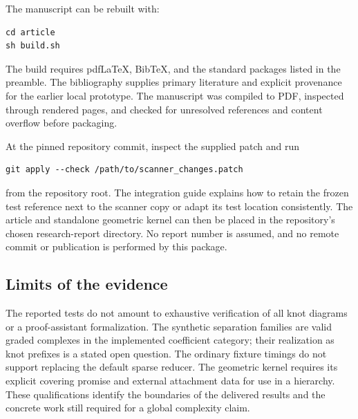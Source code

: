 The manuscript can be rebuilt with:
\begin{lstlisting}
cd article
sh build.sh
\end{lstlisting}
The build requires pdf\LaTeX{}, Bib\TeX{}, and the standard packages
listed in the preamble. The bibliography supplies primary literature
and explicit provenance for the earlier local prototype. The
manuscript was compiled to PDF, inspected through rendered pages,
and checked for unresolved references and content overflow before
packaging.

At the pinned repository commit, inspect the supplied patch and run
\begin{lstlisting}
git apply --check /path/to/scanner_changes.patch
\end{lstlisting}
from the repository root. The integration guide explains how to retain
the frozen test reference next to the scanner copy or adapt its test
location consistently. The article and standalone geometric kernel
can then be placed in the repository's chosen research-report
directory. No report number is assumed, and no remote commit or
publication is performed by this package.

\subsection{Limits of the evidence}

The reported tests do not amount to exhaustive verification of all
knot diagrams or a proof-assistant formalization. The synthetic
separation families are valid graded complexes in the implemented
coefficient category; their realization as knot prefixes is a stated
open question. The ordinary fixture timings do not support replacing
the default sparse reducer. The geometric kernel requires its explicit
covering promise and external attachment data for use in a hierarchy.
These qualifications identify the boundaries of the delivered results
and the concrete work still required for a global complexity claim.
